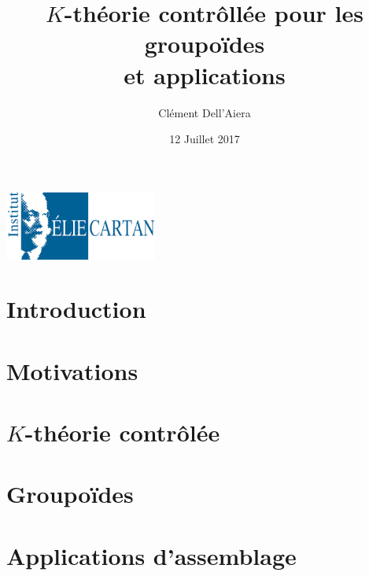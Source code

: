\documentclass{beamer}
\title[First Steps with SCRATCH]{$K$-théorie contrôllée pour les groupoïdes\\ et applications}
\author{Clément Dell'Aiera}
\institute{IECL}
\date{12 Juillet 2017}
\begin{document}
\begin{frame}
  \titlepage
\begin{center}\includegraphics[width=5cm]{IECL.png}\end{center}
\end{frame}

\begin{frame}
  \tableofcontents
\end{frame}

\section{Introduction}


\section{Motivations}
\begin{frame}
  \tableofcontents[currentsection]
\end{frame}


\section{$K$-théorie contrôlée}
\begin{frame}
  \tableofcontents[currentsection]
\end{frame}


%

\section{Groupoïdes}
\begin{frame}
  \tableofcontents[currentsection]
\end{frame}



\section{Applications d'assemblage}
\begin{frame}
  \tableofcontents[currentsection]
\end{frame}

\end{document}
